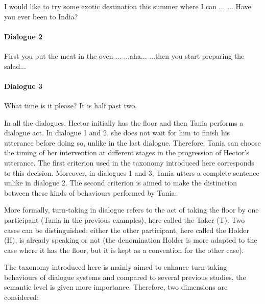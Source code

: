         \begin{dialogue}
           I would like to try some exotic destination this summer where I can ...
           ... Have you ever been to India?
        \end{dialogue}

        \paragraph{Dialogue 2}

        \begin{dialogue}
           First you put the meat in the oven ...
           ...aha...
           ...then you start preparing the salad...
        \end{dialogue}

        \paragraph{Dialogue 3}

        \begin{dialogue}
           What time is it please?
           It is half past two.
        \end{dialogue}

        In all the dialogues, Hector initially has the floor and then Tania performs a dialogue act. In dialogue 1 and 2, she does not wait for him to finish his utterance before doing so, unlike in the last dialogue. Therefore, Tania can choose the timing of her intervention at different stages in the progression of Hector's utterance. The first criterion used in the taxonomy introduced here corresponds to this decision. Moreover, in dialogues 1 and 3, Tania utters a complete sentence unlike in dialogue 2. The second criterion is aimed to make the distinction between these kinds of behaviours performed by Tania.

	More formally, turn-taking in dialogue refers to the act of taking the floor by one participant (Tania in the previous examples), here called the Taker (T). Two cases can be distinguished; either the other participant, here called the Holder (H), is already speaking or not (the denomination Holder is more adapted to the case where it has the floor, but it is kept as a convention for the other case).
    
    The taxonomy introduced here is mainly aimed to enhance turn-taking behaviours of dialogue systems and compared to several previous studies, the semantic level is given more importance. Therefore, two dimensions are considered:

